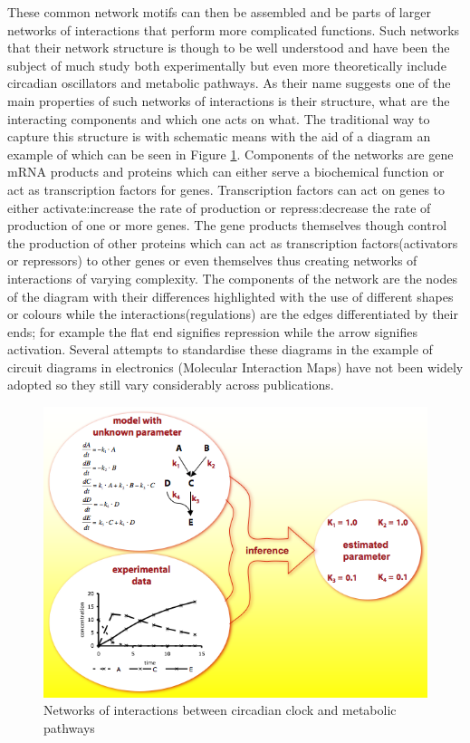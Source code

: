 \documentclass[12pt,a4paper,titlepage]{article}
\begin{document}
These common network motifs can then be assembled and be parts of larger networks of interactions that perform more complicated functions.  Such networks that their network structure is though to be well understood and have been the subject of much study both experimentally but even more theoretically include circadian oscillators and metabolic pathways\cite{bass2010circadian, sahar2012regulation, mirsky2009model}. As their name suggests one of the main properties of such networks of interactions is their structure, what are the interacting components and which one acts on what. The traditional way to capture this structure is with schematic means with the aid of a diagram an example of which can be seen in Figure \ref{fig:diagram_example}. Components of the networks are gene mRNA products and proteins which can either serve a biochemical function or act as transcription factors for genes. Transcription factors can act on genes to either activate:increase the rate of production or repress:decrease the rate of production of one or more genes. The gene products themselves though control the production of other proteins which can act as transcription factors(activators or repressors) to other genes or even themselves thus creating networks of interactions of varying complexity. The components of the network are the nodes of the diagram with their differences highlighted with the use of different shapes or colours while the interactions(regulations) are the edges differentiated by their ends; for example the flat end signifies repression while the arrow signifies activation. Several attempts to standardise these diagrams in the example of circuit diagrams in electronics (Molecular Interaction Maps\cite{kohn2006molecular}) have not been widely adopted so they still vary considerably across publications.
\begin{figure}
\centering
\includegraphics[width=0.9\linewidth]{inference}
\caption{Networks of interactions between circadian clock and metabolic pathways\cite{sahar2012regulation}}

\label{fig:diagram_example}
\end{figure}
\end{document}

